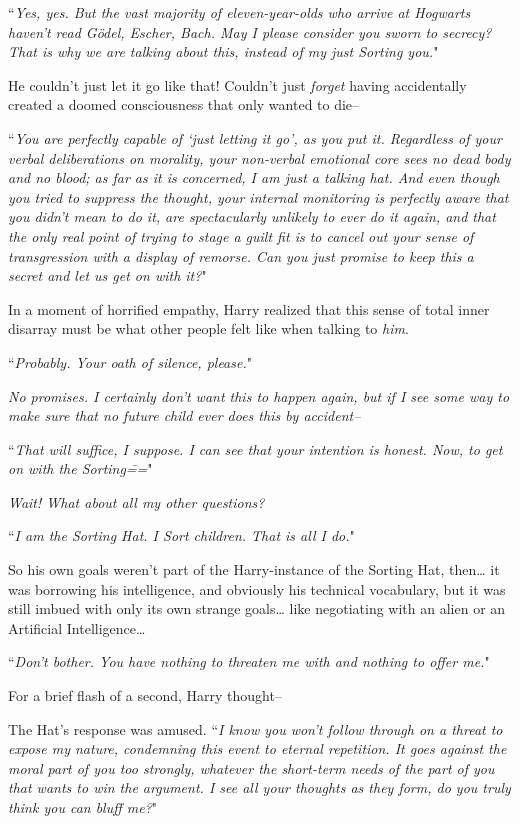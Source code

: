 ``\emph{Yes, yes. But the vast majority of eleven-year-olds who arrive at Hogwarts haven't read \emph{Gödel, Escher, Bach}. May I please consider you sworn to secrecy? That is \emph{why} we are talking about this, instead of my just Sorting you.}"

He couldn't just let it go like that! Couldn't just \emph{forget} having accidentally created a doomed consciousness that only wanted to die\---

``\emph{You are perfectly capable of `just letting it go', as you put it. Regardless of your verbal deliberations on morality, your non-verbal emotional core sees no dead body and no blood; as far as it is concerned, I am just a talking hat. And even though you tried to suppress the thought, your internal monitoring is perfectly aware that you didn't mean to do it, are spectacularly unlikely to ever do it again, and that the only real point of trying to stage a guilt fit is to cancel out your sense of transgression with a display of remorse. Can you just promise to keep this a secret and let us get on with it?}"

In a moment of horrified empathy, Harry realized that this sense of total inner disarray must be what other people felt like when talking to \emph{him}.

``\emph{Probably. Your oath of silence, please.}"

\emph{No promises. I certainly don't want this to happen again, but if I see some way to make \emph{sure} that no future child ever does this by accident\---}

``\emph{That will suffice, I suppose. I can see that your intention is honest. Now, to get on with the Sorting\===}"

\emph{Wait! What about all my other questions?}

``\emph{I am the Sorting Hat. I Sort children. That is all I do.}"

So his own goals weren't part of the Harry-instance of the Sorting Hat, then{\ldots} it was borrowing his intelligence, and obviously his technical vocabulary, but it was still imbued with only its own strange goals{\ldots} like negotiating with an alien or an Artificial Intelligence{\ldots}

``\emph{Don't bother. You have nothing to threaten me with and nothing to offer me.}"

For a brief flash of a second, Harry thought\---

The Hat's response was amused. ``\emph{I know you won't follow through on a threat to expose my nature, condemning this event to eternal repetition. It goes against the moral part of you too strongly, whatever the short-term needs of the part of you that wants to win the argument. I see all your thoughts as they form, do you truly think you can bluff me?}"

